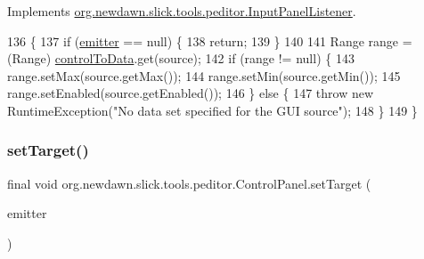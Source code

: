 Implements \mbox{\hyperlink{interfaceorg_1_1newdawn_1_1slick_1_1tools_1_1peditor_1_1_input_panel_listener_a2f2fda874b026dd19ca947af14bc65c0}{org.\+newdawn.\+slick.\+tools.\+peditor.\+Input\+Panel\+Listener}}.


\begin{DoxyCode}
136                                                   \{
137         \textcolor{keywordflow}{if} (\mbox{\hyperlink{classorg_1_1newdawn_1_1slick_1_1tools_1_1peditor_1_1_control_panel_aaa170169fa574cb6b271f782afcd2517}{emitter}} == null) \{
138             \textcolor{keywordflow}{return};
139         \}
140         
141         Range range = (Range) \mbox{\hyperlink{classorg_1_1newdawn_1_1slick_1_1tools_1_1peditor_1_1_control_panel_a7316bd7b85c2e289dbafe9b65e33a474}{controlToData}}.get(source);
142         \textcolor{keywordflow}{if} (range != null) \{
143             range.setMax(source.getMax());
144             range.setMin(source.getMin());
145             range.setEnabled(source.getEnabled());
146         \} \textcolor{keywordflow}{else} \{
147             \textcolor{keywordflow}{throw} \textcolor{keyword}{new} RuntimeException(\textcolor{stringliteral}{"No data set specified for the GUI source"});
148         \}
149     \}
\end{DoxyCode}
\mbox{\label{classorg_1_1newdawn_1_1slick_1_1tools_1_1peditor_1_1_control_panel_a83d17b9ce4698ad051b90a27e9bc08d0}} 
\subsubsection{\texorpdfstring{set\+Target()}{setTarget()}}
{\footnotesize\ttfamily final void org.\+newdawn.\+slick.\+tools.\+peditor.\+Control\+Panel.\+set\+Target (\begin{DoxyParamCaption}\item[{\mbox{\hyperlink{classorg_1_1newdawn_1_1slick_1_1particles_1_1_configurable_emitter}{Configurable\+Emitter}}}]{emitter }\end{DoxyParamCaption})\hspace{0.3cm}{\ttfamily [inline]}}

